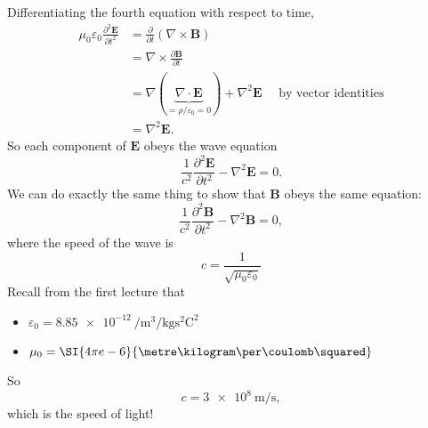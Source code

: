 \documentclass[a4paper]{article}
\begin{document}
Differentiating the fourth equation with respect to time,
\begin{align*}
  \mu_0\varepsilon_0 \frac{\partial^2 \mathbf{E}}{\partial t^2} &= \frac{\partial }{\partial t}(\nabla\times \mathbf{B})\\
  &= \nabla\times \frac{\partial \mathbf{B}}{\partial t}\\
  &= \nabla(\underbrace{\nabla\cdot \mathbf{E}}_{ = \rho/\varepsilon_0 = 0}) + \nabla^2 \mathbf{E}\quad \text{ by vector identities}\\
  &= \nabla^2 \mathbf{E}.
\end{align*}
So each component of $\mathbf{E}$ obeys the wave equation
\[
  \frac{1}{c^2}\frac{\partial^2 \mathbf{E}}{\partial t^2} - \nabla^2 \mathbf{E} = 0.
\]
We can do exactly the same thing to show that $\mathbf{B}$ obeys the same equation:
\[
  \frac{1}{c^2}\frac{\partial^2 \mathbf{B}}{\partial t^2} - \nabla^2 \mathbf{B} = 0,
\]
where the speed of the wave is
\[
  c = \frac{1}{\sqrt{\mu_0\varepsilon_0}}
\]
Recall from the first lecture that
\begin{itemize}
  \item $\varepsilon_0 = \SI{8.85e-12}{\per\metre\cubed\per\kilogram\s\squared\coulomb\squared}$
  \item $\mu_0 = \SI{4\pi e-6}{\metre\kilogram\per\coulomb\squared}$
\end{itemize}
So
\[
  c = \SI{3e8}{\meter\per\second},
\]
which is the speed of light!
\end{document}
